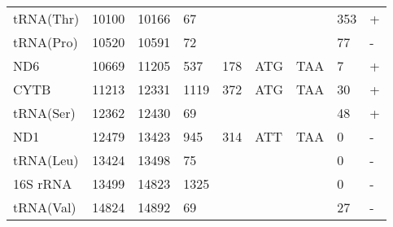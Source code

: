 \documentclass[../DISSERTACAO_MAIN.tex]{subfiles}
\begin{document}
\begin{longtable}{llllllllllllllllllllll}
			tRNA(Thr)    & 10100          & \multicolumn{2}{l}{10166} & \multicolumn{2}{l}{67}         & \multicolumn{3}{l}{}                          & \multicolumn{3}{l}{}              & \multicolumn{3}{l}{}      & \multicolumn{3}{l}{353}         & \multicolumn{4}{l}{+}                  \\
			tRNA(Pro)    & 10520          & \multicolumn{2}{l}{10591} & \multicolumn{2}{l}{72}         & \multicolumn{3}{l}{}                          & \multicolumn{3}{l}{}              & \multicolumn{3}{l}{}      & \multicolumn{3}{l}{77}          & \multicolumn{4}{l}{-}                  \\
			ND6          & 10669          & \multicolumn{2}{l}{11205} & \multicolumn{2}{l}{537}        & \multicolumn{3}{l}{178}                       & \multicolumn{3}{l}{ATG}           & \multicolumn{3}{l}{TAA}   & \multicolumn{3}{l}{7}           & \multicolumn{4}{l}{+}                  \\
			CYTB         & 11213          & \multicolumn{2}{l}{12331} & \multicolumn{2}{l}{1119}       & \multicolumn{3}{l}{372}                       & \multicolumn{3}{l}{ATG}           & \multicolumn{3}{l}{TAA}   & \multicolumn{3}{l}{30}          & \multicolumn{4}{l}{+}                  \\
			tRNA(Ser)    & 12362          & \multicolumn{2}{l}{12430} & \multicolumn{2}{l}{69}         & \multicolumn{3}{l}{}                          & \multicolumn{3}{l}{}              & \multicolumn{3}{l}{}      & \multicolumn{3}{l}{48}          & \multicolumn{4}{l}{+}                  \\
			ND1          & 12479          & \multicolumn{2}{l}{13423} & \multicolumn{2}{l}{945}        & \multicolumn{3}{l}{314}                       & \multicolumn{3}{l}{ATT}           & \multicolumn{3}{l}{TAA}   & \multicolumn{3}{l}{0}           & \multicolumn{4}{l}{-}                  \\
			tRNA(Leu)    & 13424          & \multicolumn{2}{l}{13498} & \multicolumn{2}{l}{75}         & \multicolumn{3}{l}{}                          & \multicolumn{3}{l}{}              & \multicolumn{3}{l}{}      & \multicolumn{3}{l}{0}           & \multicolumn{4}{l}{-}                  \\
			16S 				rRNA & 13499          & \multicolumn{2}{l}{14823} & \multicolumn{2}{l}{1325}       & \multicolumn{3}{l}{}                          & \multicolumn{3}{l}{}              & \multicolumn{3}{l}{}      & \multicolumn{3}{l}{0}           & \multicolumn{4}{l}{-}                  \\
			tRNA(Val)    & 14824          & \multicolumn{2}{l}{14892} & \multicolumn{2}{l}{69}         & \multicolumn{3}{l}{}                          & \multicolumn{3}{l}{}              & \multicolumn{3}{l}{}      & \multicolumn{3}{l}{27}          & \multicolumn{4}{l}{-}                  \\

\end{longtable}
\end{document}
